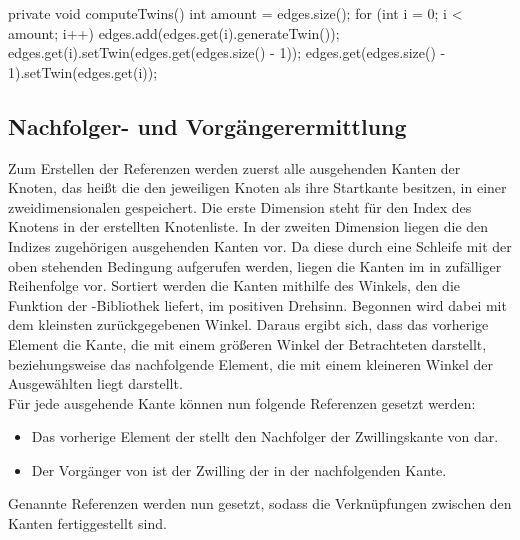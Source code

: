 \begin{code}
private void computeTwins() {
	int amount = edges.size();
	for (int i = 0; i < amount; i++) {
		edges.add(edges.get(i).generateTwin());
		edges.get(i).setTwin(edges.get(edges.size() - 1));
		edges.get(edges.size() - 1).setTwin(edges.get(i));
	}
}
\end{code}

\subsection{Nachfolger- und Vorgängerermittlung}
Zum Erstellen der Referenzen werden zuerst alle ausgehenden Kanten der Knoten, das heißt die den jeweiligen Knoten als ihre Startkante besitzen, in einer zweidimensionalen  gespeichert.
Die erste Dimension steht für den Index des Knotens in der erstellten Knotenliste.
In der zweiten Dimension liegen die den Indizes zugehörigen ausgehenden Kanten vor.
Da diese durch eine  Schleife mit der oben stehenden Bedingung aufgerufen werden, liegen die Kanten im  in zufälliger Reihenfolge vor.
Sortiert werden die Kanten mithilfe des Winkels, den die Funktion  der -Bibliothek liefert, im positiven Drehsinn.
Begonnen wird dabei mit dem kleinsten zurückgegebenen Winkel.
Daraus ergibt sich, dass das vorherige Element die Kante, die mit einem größeren Winkel  der Betrachteten darstellt, beziehungsweise das nachfolgende Element, die mit einem kleineren Winkel  der Ausgewählten liegt darstellt. \\
Für jede ausgehende Kante  können nun folgende Referenzen gesetzt werden:

\begin{itemize}
	\item Das vorherige Element der  stellt den Nachfolger der Zwillingskante von  dar.
	\item Der Vorgänger von  ist der Zwilling der in der  nachfolgenden Kante.
\end{itemize}

Genannte Referenzen werden nun gesetzt, sodass die Verknüpfungen zwischen den Kanten fertiggestellt sind.\\

